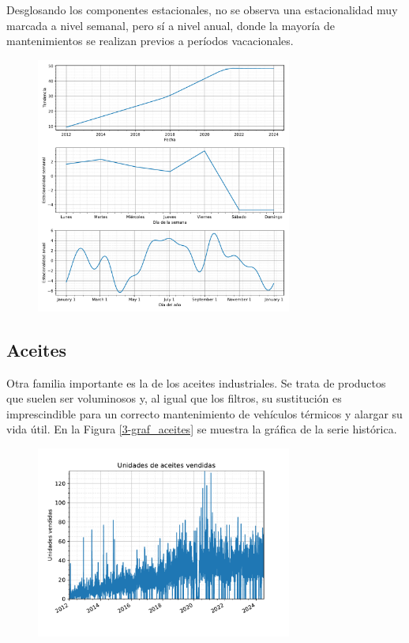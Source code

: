 Desglosando los componentes estacionales, no se observa una estacionalidad muy marcada a nivel semanal, pero sí a nivel anual, donde la mayoría de mantenimientos se realizan previos a períodos vacacionales.

\begin{figure}[H]
	{\includegraphics[width=0.75\textwidth]{imagenes/comps_filtros.pdf}}
\end{figure}

\subsection{Aceites}

Otra familia importante es la de los aceites industriales. Se trata de productos que suelen ser voluminosos y, al igual que los filtros, su sustitución es imprescindible para un correcto mantenimiento de vehículos térmicos y alargar su vida útil. En la Figura \ref*{3-graf_aceites} se muestra la gráfica de la serie histórica.

\begin{figure}[H]
	{\includegraphics[width=0.75\textwidth]{imagenes/grafica_aceites.pdf}}
\end{figure}



